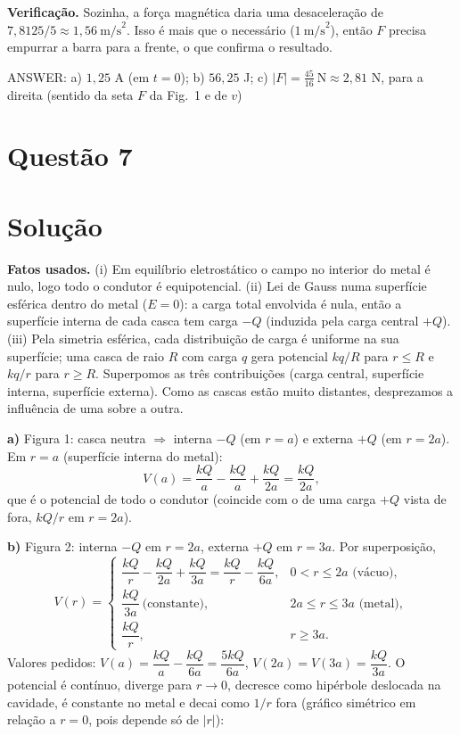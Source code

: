 \documentclass{article}%
\begin{document}
\textbf{Verificação.} Sozinha, a força magnética daria uma desaceleração de $7{,}8125/5\approx 1{,}56\ \text{m/s}^2$. Isso é mais que o necessário ($1\ \text{m/s}^2$), então $F$ precisa empurrar a barra para a frente, o que confirma o resultado.

ANSWER: a) $1{,}25$ A (em $t=0$); b) $56{,}25$ J; c) $|F|=\frac{45}{16}\ \text{N}\approx 2{,}81$ N, para a direita (sentido da seta $F$ da Fig.~1 e de $v$)%
\newpage%
\section*{Questão 7}

\section*{Solução}

\textbf{Fatos usados.} (i) Em equilíbrio eletrostático o campo no interior do metal é nulo, logo todo o condutor é equipotencial. (ii) Lei de Gauss numa superfície esférica dentro do metal ($E=0$): a carga total envolvida é nula, então a superfície interna de cada casca tem carga $-Q$ (induzida pela carga central $+Q$). (iii) Pela simetria esférica, cada distribuição de carga é uniforme na sua superfície; uma casca de raio $R$ com carga $q$ gera potencial $kq/R$ para $r\le R$ e $kq/r$ para $r\ge R$. Superpomos as três contribuições (carga central, superfície interna, superfície externa). Como as cascas estão muito distantes, desprezamos a influência de uma sobre a outra.

\textbf{a)} Figura 1: casca neutra $\Rightarrow$ interna $-Q$ (em $r=a$) e externa $+Q$ (em $r=2a$). Em $r=a$ (superfície interna do metal):
\[
V(a)=\frac{kQ}{a}-\frac{kQ}{a}+\frac{kQ}{2a}=\frac{kQ}{2a},
\]
que é o potencial de todo o condutor (coincide com o de uma carga $+Q$ vista de fora, $kQ/r$ em $r=2a$).

\textbf{b)} Figura 2: interna $-Q$ em $r=2a$, externa $+Q$ em $r=3a$. Por superposição,
\[
V(r)=\begin{cases}
\dfrac{kQ}{r}-\dfrac{kQ}{2a}+\dfrac{kQ}{3a}=\dfrac{kQ}{r}-\dfrac{kQ}{6a}, & 0<r\le 2a \text{ (vácuo)},\\[2mm]
\dfrac{kQ}{3a}\ \text{(constante)}, & 2a\le r\le 3a \text{ (metal)},\\[2mm]
\dfrac{kQ}{r}, & r\ge 3a .
\end{cases}
\]
Valores pedidos: $V(a)=\dfrac{kQ}{a}-\dfrac{kQ}{6a}=\dfrac{5kQ}{6a}$, \quad $V(2a)=V(3a)=\dfrac{kQ}{3a}$. O potencial é contínuo, diverge para $r\to 0$, decresce como hipérbole deslocada na cavidade, é constante no metal e decai como $1/r$ fora (gráfico simétrico em relação a $r=0$, pois depende só de $|r|$):
\end{document}
